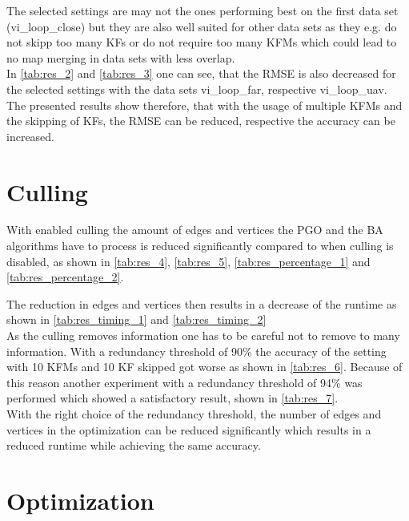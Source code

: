 The selected settings are may not the ones performing best on the first data set (vi\_loop\_close) but they are also well suited for other data sets as they e.g. do not skipp too many \acp{KF} or do not require too many \acp{KFM} which could lead to no map merging in data sets with less overlap.\\

In \autoref{tab:res_2} and \autoref{tab:res_3} one can see, that the \ac{RMSE} is also decreased for the selected settings with the data sets vi\_loop\_far, respective vi\_loop\_uav.\\

The presented results show therefore, that with the usage of multiple \acp{KFM} and the skipping of \acp{KF}, the \ac{RMSE} can be reduced, respective the accuracy can be increased.

\section{Culling}

With enabled culling the amount of edges and vertices the \ac{PGO} and the \ac{BA} algorithms have to process is reduced significantly compared to when culling is disabled, as shown in \autoref{tab:res_4}, \autoref{tab:res_5}, \autoref{tab:res_percentage_1} and \autoref{tab:res_percentage_2}.

The reduction in edges and vertices then results in a decrease of the runtime as shown in \autoref{tab:res_timing_1} and \autoref{tab:res_timing_2}\\

As the culling removes information one has to be careful not to remove to many information. With a redundancy threshold of 90\% the accuracy of the setting with 10 \acp{KFM} and 10 \ac{KF} skipped got worse as shown in \autoref{tab:res_6}. Because of this reason another experiment with a redundancy threshold of 94\% was performed which showed a satisfactory result, shown in \autoref{tab:res_7}.\\

With the right choice of the redundancy threshold, the number of edges and vertices in the optimization can be reduced significantly which results in a reduced runtime while achieving the same accuracy. 

\section{Optimization}


